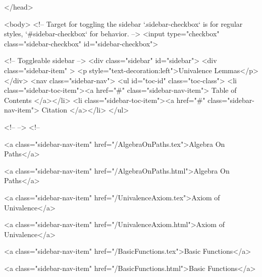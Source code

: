   
</head>




  <body>
    <!-- Target for toggling the sidebar `.sidebar-checkbox` is for regular
     styles, `#sidebar-checkbox` for behavior. -->
<input type="checkbox" class="sidebar-checkbox" id="sidebar-checkbox">

<!-- Toggleable sidebar -->
<div class="sidebar" id="sidebar">
  <div class="sidebar-item" >
    <p style="text-decoration:left">Univalence Lemmas</p>
  </div>
  <nav class="sidebar-nav">
    <ul id="toc-id" class="toc-class">
  <li class="sidebar-toc-item"><a href="#" class="sidebar-nav-item"> Table of Contents </a></li>
  <li class="sidebar-toc-item"><a href="#" class="sidebar-nav-item"> Citation </a></li>
</ul>


    <!--  -->
    <!-- 
      
    
      
    
      
    
      
        
      
    
      
        
          <a class="sidebar-nav-item" href="/AlgebraOnPaths.tex">Algebra On Paths</a>
        
      
    
      
        
          <a class="sidebar-nav-item" href="/AlgebraOnPaths.html">Algebra On Paths</a>
        
      
    
      
        
          <a class="sidebar-nav-item" href="/UnivalenceAxiom.tex">Axiom of Univalence</a>
        
      
    
      
        
          <a class="sidebar-nav-item" href="/UnivalenceAxiom.html">Axiom of Univalence</a>
        
      
    
      
        
          <a class="sidebar-nav-item" href="/BasicFunctions.tex">Basic Functions</a>
        
      
    
      
        
          <a class="sidebar-nav-item" href="/BasicFunctions.html">Basic Functions</a>
        
      
    
      
        
